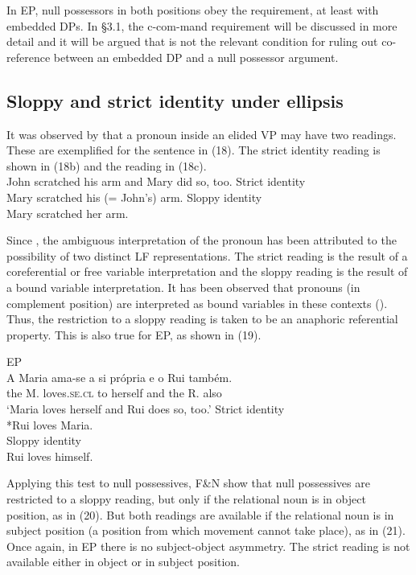 \documentclass[output=paper]{langsci/langscibook}
\begin{document}
In EP, null possessors in both positions obey the  requirement, at least with embedded DPs. In §3.1, the c-com-mand requirement will be discussed in more detail and it will be argued that  is not the relevant condition for ruling out co-reference between an embedded DP and a null possessor argument.

\subsection{Sloppy and strict identity under ellipsis}%

It was observed by \citet{Ross1967,Ross1969} that a pronoun inside an elided VP may have two readings. These are exemplified for the sentence in (18). The strict identity reading is shown in (18b) and the  reading in (18c).
\pagebreak
\ea%
\citep[207]{Ross1967}\label{ex:wein:18}\\
\ea John scratched his arm and Mary did so, too.
\ex Strict identity\\Mary scratched his (= John’s) arm.
\ex Sloppy identity\\Mary scratched her arm.
\z
\z

Since \citet{Sag1980}, the ambiguous interpretation of the pronoun has been attributed to the possibility of two distinct LF representations. The strict reading is the result of a coreferential or free variable interpretation and the sloppy reading is the result of a bound variable interpretation. It has been observed that  pronouns (in complement position) are interpreted as bound variables in these contexts (\citealt{Sag1980,Hicks2009}). Thus, the restriction to a sloppy reading is taken to be an anaphoric referential property. This is also true for EP, as shown in (19).

\ea%
    EP\label{ex:wein:19}\\
    \ea \gll A Maria ama-se a {si própria} e o Rui também.\\
         the M. loves.\textsc{se.cl} to herself and the R. also\\
    \glt ‘Maria loves herself and Rui does so, too.’
    \ex Strict identity\\
        *Rui loves Maria.\\
    \ex Sloppy identity\\
        Rui loves himself.
    \z
\z
          
Applying this test to null possessives, F\&N show that null possessives are restricted to a sloppy reading, but only if the relational noun is in object position, as in (20). But both readings are available if the relational noun is in subject position (a position from which movement cannot take place), as in (21). Once again, in EP there is no subject-object asymmetry. The strict reading is not available either in object or in subject position.
\end{document}
